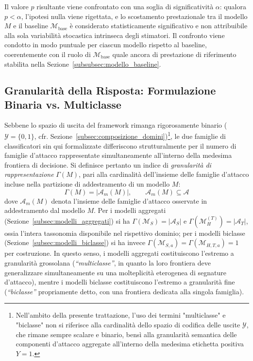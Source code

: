 Il valore $p$ risultante viene confrontato con una soglia di significatività $\alpha$: qualora $p < \alpha$, l'ipotesi nulla viene rigettata, e lo scostamento prestazionale tra il modello $M$ e il baseline $\mathcal{M}_{\text{base}}$ è considerato statisticamente significativo e non attribuibile alla sola variabilità stocastica intrinseca degli stimatori. Il confronto viene condotto in modo puntuale per ciascun modello rispetto al baseline, coerentemente con il ruolo di $\mathcal{M}_{\text{base}}$ quale ancora di prestazione di riferimento stabilita nella Sezione~\ref{subsubsec:modello_baseline}.

\subsection{Granularità della Risposta: Formulazione Binaria vs. Multiclasse}
\label{subsec:granularita_risposta}

Sebbene lo spazio di uscita del framework rimanga rigorosamente binario ($\mathcal{Y} = \{0,1\}$, cfr. Sezione~\ref{subsec:composizione_domini})\footnote{Nell'ambito della presente trattazione, l'uso dei termini "multiclasse" e "biclasse" non si riferisce alla cardinalità dello spazio di codifica delle uscite $\mathcal{Y}$, che rimane sempre scalare e binario, bensì alla granularità semantica delle componenti d'attacco aggregate all'interno della medesima etichetta positiva $Y=1$.}, le due famiglie di classificatori sin qui formalizzate differiscono strutturalmente per il numero di famiglie d'attacco rappresentate simultaneamente all'interno della medesima frontiera di decisione. Si definisce pertanto un indice di \textit{granularità di rappresentazione} $\Gamma(M)$, pari alla cardinalità dell'insieme delle famiglie d'attacco incluse nella partizione di addestramento di un modello $M$:
\begin{equation}
    \Gamma(M) = \left| \mathcal{A}_m(M) \right|, \qquad \mathcal{A}_m(M) \subseteq \mathcal{A}
    \label{eq:granularity_index}
\end{equation}
dove $\mathcal{A}_m(M)$ denota l'insieme delle famiglie d'attacco osservate in addestramento dal modello $M$. Per i modelli aggregati (Sezione~\ref{subsec:modelli_aggregati}) si ha $\Gamma(\mathcal{M}_S) = |\mathcal{A}_S|$ e $\Gamma(\mathcal{M}_H^{(T)}) = |\mathcal{A}_T|$, ossia l'intera tassonomia disponibile nel rispettivo dominio; per i modelli biclasse (Sezione~\ref{subsec:modelli_biclasse}) si ha invece $\Gamma(\mathcal{M}_{S,a}) = \Gamma(\mathcal{M}_{H,T,a}) = 1$ per costruzione. In questo senso, i modelli aggregati costituiscono l'estremo a granularità grossolana (\textit{``multiclasse''}, in quanto la loro frontiera deve generalizzare simultaneamente su una molteplicità eterogenea di segnature d'attacco), mentre i modelli biclasse costituiscono l'estremo a granularità fine (\textit{``biclasse''} propriamente detto, con una frontiera dedicata alla singola famiglia).

